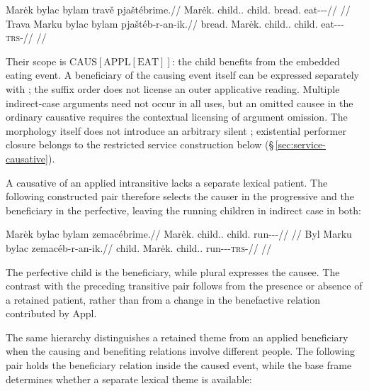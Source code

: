 \pex\label{ex:val-caus-appl}
\a
\begingl
\gla Marėk bylac bylam travě pjaštébrime.//
\glb Marėk.\Dir{} child.\Ind{}.\Pl{} child.\Ind{} bread.\Ind{} eat-\Appl{}-\Caus{}-\Prog{}//
\glft {}//
\endgl
\a
\begingl
\gla Trava Marku bylac bylam pjaštéb-r-an-ik.//
\glb bread.\Dir{} Marėk.\Trs{} child.\Ind{}.\Pl{} child.\Ind{} eat-\Appl{}-\Caus{}-\textsc{trs}-\Pf{}//
\glft {}//
\endgl
\xe

Their scope is $\mathrm{CAUS}[\mathrm{APPL}[\mathrm{EAT}]]$: the child benefits
from the embedded eating event. A beneficiary of the causing event itself can
be expressed separately with ; the suffix order does not license an
outer applicative reading. Multiple indirect-case arguments need not occur in
all uses, but an omitted causee in the ordinary causative requires the
contextual licensing of argument omission. The morphology itself does not
introduce an arbitrary silent ; existential performer closure
belongs to the restricted service construction below
(§\,\ref{sec:service-causative}).

A causative of an applied intransitive lacks a separate lexical patient.
The following constructed pair therefore selects the causer in the
progressive and the beneficiary in the perfective, leaving the running
children in indirect case in both:

\pex\label{ex:val-caus-appl-intransitive}
\a
\begingl
\gla Marėk bylac bylam zemacébrime.//
\glb Marėk.\Dir{} child.\Ind{}.\Pl{} child.\Ind{} run-\Appl{}-\Caus{}-\Prog{}//
\glft {}//
\endgl
\a
\begingl
\gla Byl Marku bylac zemacéb-r-an-ik.//
\glb child.\Dir{} Marėk.\Trs{} child.\Ind{}.\Pl{} run-\Appl{}-\Caus{}-\textsc{trs}-\Pf{}//
\glft {}//
\endgl
\xe

The perfective child is the beneficiary, while plural 
expresses the causee. The contrast with the preceding transitive pair
follows from the presence or absence of a retained patient, rather than from
a change in the benefactive relation contributed by Appl.

The same hierarchy distinguishes a retained theme from an applied
beneficiary when the causing and benefiting relations involve different
people. The following pair holds the beneficiary relation inside the caused
event, while the base frame determines whether a separate lexical theme is
available:

